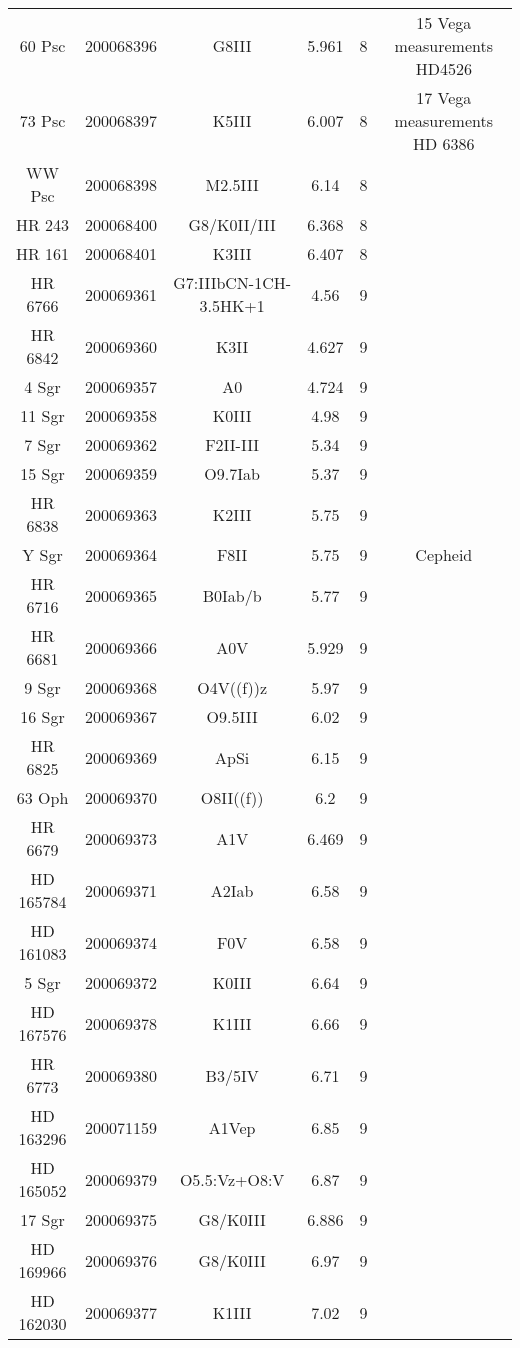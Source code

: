 \begin{table*}
\begin{tabular}{cccccc}
60 Psc & 200068396 & G8III & 5.961 & 8 & 15 Vega measurements HD4526 \\
73 Psc & 200068397 & K5III & 6.007 & 8 & 17 Vega measurements HD 6386 \\
WW Psc & 200068398 & M2.5III & 6.14 & 8 &  \\
HR 243 & 200068400 & G8/K0II/III & 6.368 & 8 &  \\
HR 161 & 200068401 & K3III & 6.407 & 8 &  \\
HR 6766 & 200069361 & G7:IIIbCN-1CH-3.5HK+1 & 4.56 & 9 &  \\
HR 6842 & 200069360 & K3II & 4.627 & 9 &  \\
4 Sgr & 200069357 & A0 & 4.724 & 9 &  \\
11 Sgr & 200069358 & K0III & 4.98 & 9 &  \\
7 Sgr & 200069362 & F2II-III & 5.34 & 9 &  \\
15 Sgr & 200069359 & O9.7Iab & 5.37 & 9 &  \\
HR 6838 & 200069363 & K2III & 5.75 & 9 &  \\
Y Sgr & 200069364 & F8II & 5.75 & 9 & Cepheid \\
HR 6716 & 200069365 & B0Iab/b & 5.77 & 9 &  \\
HR 6681 & 200069366 & A0V & 5.929 & 9 &  \\
9 Sgr & 200069368 & O4V((f))z & 5.97 & 9 &  \\
16 Sgr & 200069367 & O9.5III & 6.02 & 9 &  \\
HR 6825 & 200069369 & ApSi & 6.15 & 9 &  \\
63 Oph & 200069370 & O8II((f)) & 6.2 & 9 &  \\
HR 6679 & 200069373 & A1V & 6.469 & 9 &  \\
HD 165784 & 200069371 & A2Iab & 6.58 & 9 &  \\
HD 161083 & 200069374 & F0V & 6.58 & 9 &  \\
5 Sgr & 200069372 & K0III & 6.64 & 9 &  \\
HD 167576 & 200069378 & K1III & 6.66 & 9 &  \\
HR 6773 & 200069380 & B3/5IV & 6.71 & 9 &  \\
HD 163296 & 200071159 & A1Vep & 6.85 & 9 &  \\
HD 165052 & 200069379 & O5.5:Vz+O8:V & 6.87 & 9 &  \\
17 Sgr & 200069375 & G8/K0III & 6.886 & 9 &  \\
HD 169966 & 200069376 & G8/K0III & 6.97 & 9 &  \\
HD 162030 & 200069377 & K1III & 7.02 & 9 &  \\

\end{tabular}
\end{table*}
